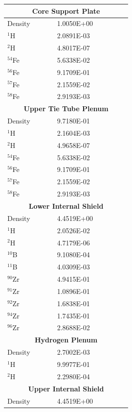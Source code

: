 \documentclass[8pt,a5paper]{article}
\begin{document}
\begin{longtable}{|m{0.3\linewidth}|m{0.45\linewidth}|}
    \multicolumn{2}{|c|}{\textbf{Core Support Plate}}\\\hline
    Density & \SI{1.0050E+00}{} \\
    $^{1}$H & \SI{2.0891E-03}{} \\
    $^{2}$H & \SI{4.8017E-07}{} \\
    $^{54}$Fe & \SI{5.6338E-02}{} \\
    $^{56}$Fe & \SI{9.1709E-01}{} \\
    $^{57}$Fe & \SI{2.1559E-02}{} \\
    $^{58}$Fe & \SI{2.9193E-03}{} \\\hline
    \multicolumn{2}{|c|}{\textbf{Upper Tie Tube Plenum}}\\\hline
    Density & \SI{9.7180E-01}{} \\
    $^{1}$H & \SI{2.1604E-03}{} \\
    $^{2}$H & \SI{4.9658E-07}{} \\
    $^{54}$Fe & \SI{5.6338E-02}{} \\
    $^{56}$Fe & \SI{9.1709E-01}{} \\
    $^{57}$Fe & \SI{2.1559E-02}{} \\
    $^{58}$Fe & \SI{2.9193E-03}{} \\\hline
    \multicolumn{2}{|c|}{\textbf{Lower Internal Shield}}\\\hline
    Density & \SI{4.4519E+00}{} \\
    $^{1}$H & \SI{2.0526E-02}{} \\
    $^{2}$H & \SI{4.7179E-06}{} \\
    $^{10}$B & \SI{9.1080E-04}{} \\
    $^{11}$B & \SI{4.0309E-03}{} \\
    $^{90}$Zr & \SI{4.9415E-01}{} \\
    $^{91}$Zr & \SI{1.0896E-01}{} \\
    $^{92}$Zr & \SI{1.6838E-01}{} \\
    $^{94}$Zr & \SI{1.7435E-01}{} \\
    $^{96}$Zr & \SI{2.8688E-02}{} \\\hline
    \multicolumn{2}{|c|}{\textbf{Hydrogen Plenum}}\\\hline
    Density & \SI{2.7002E-03}{} \\
    $^{1}$H & \SI{9.9977E-01}{} \\
    $^{2}$H & \SI{2.2980E-04}{} \\\hline
    \multicolumn{2}{|c|}{\textbf{Upper Internal Shield}}\\\hline
    Density & \SI{4.4519E+00}{} \\

\end{longtable}
\end{document}
